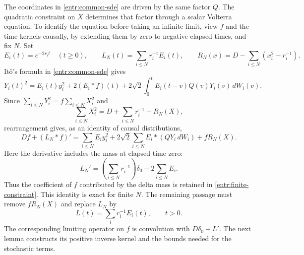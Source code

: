 The coordinates in \eqref{entr:common-sde} are driven by the same
factor \(Q\).  The quadratic constraint on \(X\) determines that
factor through a scalar Volterra equation.  To identify the equation
before taking an infinite limit, view \(f\) and the time kernels causally,
by extending them by zero to negative elapsed times, and fix \(N\).  Set
\[
 E_i(t)=e^{-2r_it}\quad(t\ge0),\qquad
 L_N(t)=\sum_{i\le N}r_i^{-1}E_i(t),\qquad
 R_N(x)=D-\sum_{i\le N}(x_i^2-r_i^{-1}).
\]
Itô's formula in \eqref{entr:common-sde} gives
\[
 Y_i(t)^2=E_i(t)y_i^2+2(E_i*f)(t)
       +2\sqrt2\int_0^t E_i(t-v)Q(v)Y_i(v)\,dW_i(v).
\]
Since \(\sum_{i\le N}Y_i^2=f\sum_{i\le N}X_i^2\) and
\[
 \sum_{i\le N}X_i^2
   =D+\sum_{i\le N}r_i^{-1}-R_N(X),
\]
rearrangement gives, as an identity of causal distributions,
\begin{equation}\label{entr:finite-constraint}
 Df+(L_N*f)'=
 \sum_{i\le N}E_i y_i^2
 +2\sqrt2\sum_{i\le N} E_i*(QY_i\,dW_i)+fR_N(X).
\end{equation}
Here the derivative includes the mass at elapsed time zero:
\begin{equation}\label{entr:initial-delta}
 L_N'=\left(\sum_{i\le N}r_i^{-1}\right)\delta_0
                       -2\sum_{i\le N}E_i .
\end{equation}
Thus the coefficient of \(f\) contributed by the delta mass is retained
in \eqref{entr:finite-constraint}.  This identity is exact for finite
\(N\).  The remaining passage must remove \(fR_N(X)\) and replace
\(L_N\) by
\[
 L(t)=\sum_i r_i^{-1}E_i(t),\qquad t>0.
\]
The corresponding limiting operator on \(f\) is convolution with
\(D\delta_0+L'\).  The next lemma constructs its positive inverse
kernel and the bounds needed for the stochastic terms.

